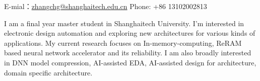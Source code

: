 \documentclass[10pt,a4paper]{article} %
\begin{document}


E-mial：\noindent\href{mailto:zhangchg@shanghaitech.edu.cn}{zhangchg@shanghaitech.edu.cn}\bull %
Phone: +86 13102002813 %

\spacedhrule{0.9em}{-0.4em} %





I am a final year master student in Shanghaitech University.
I'm interested in electronic design automation and exploring new architectures for various kinds of applications.
My current research focuses on In-memory-computing, ReRAM based neural network accelerator and its reliability.
I am also broadly interested in DNN model compression, AI-assisted EDA, AI-assisted design for architecture, domain specific architecture.


\spacedhrule{0.5em}{-0.4em} %

\end{document}
